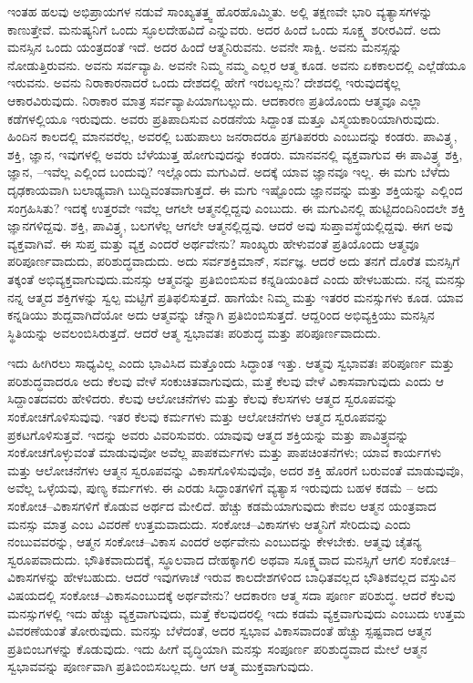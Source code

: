 ಇಂತಹ ಹಲವು ಅಭಿಪ್ರಾಯಗಳ ನಡುವೆ ಸಾಂಖ್ಯತತ್ತ್ವ ಹೊರಹೊಮ್ಮಿತು. ಅಲ್ಲಿ ತಕ್ಷಣವೇ ಭಾರಿ ವ್ಯತ್ಯಾಸಗಳನ್ನು ಕಾಣುತ್ತೇವೆ. ಮನುಷ್ಯನಿಗೆ ಒಂದು ಸ್ಫೂಲದೇಹವಿದೆ ಎನ್ನುವರು. ಅದರ ಹಿಂದೆ ಒಂದು ಸೂಕ್ಷ್ಮ ಶರೀರವಿದೆ. ಅದು ಮನಸ್ಸಿನ ಒಂದು ಯಂತ್ರದಂತೆ ಇದೆ. ಅದರ ಹಿಂದೆ ಆತ್ಮನಿರುವನು. ಅವನೇ ಸಾಕ್ಷಿ. ಅವನು ಮನಸ್ಸನ್ನು ನೋಡುತ್ತಿರುವನು. ಅವನು ಸರ್ವವ್ಯಾಪಿ. ಅವನೇ ನಿಮ್ಮ ನಮ್ಮ ಎಲ್ಲರ ಆತ್ಮ ಕೂಡ. ಅವನು ಏಕಕಾಲದಲ್ಲಿ ಎಲ್ಲೆಡೆಯೂ ಇರುವನು. ಅವನು ನಿರಾಕಾರನಾದರೆ ಒಂದು ದೇಶದಲ್ಲಿ ಹೇಗೆ ಇರಬಲ್ಲನು? ದೇಶದಲ್ಲಿ ಇರುವುದಕ್ಕೆಲ್ಲ ಆಕಾರವಿರುವುದು. ನಿರಾಕಾರ ಮಾತ್ರ ಸರ್ವವ್ಯಾಪಿಯಾಗಬಲ್ಲುದು. ಆದಕಾರಣ ಪ್ರತಿಯೊಂದು ಆತ್ಮವೂ ಎಲ್ಲಾ ಕಡೆಗಳಲ್ಲಿಯೂ ಇರುವುದು. ಅವರು ಪ್ರತಿಪಾದಿಸುವ ಎರಡನೆಯ ಸಿದ್ದಾಂತ ಮತ್ತೂ ವಿಸ್ಮಯಕಾರಿಯಾಗಿರುವುದು. ಹಿಂದಿನ ಕಾಲದಲ್ಲಿ ಮಾನವರೆಲ್ಲ, ಅವರಲ್ಲಿ ಬಹುಪಾಲು ಜನರಾದರೂ ಪ್ರಗತಿಪರರು ಎಂಬುದನ್ನು ಕಂಡರು. ಪಾವಿತ್ರ್ಯ, ಶಕ್ತಿ, ಜ್ಞಾನ, ಇವುಗಳಲ್ಲಿ ಅವರು ಬೆಳೆಯುತ್ತ ಹೋಗುವುದನ್ನು ಕಂಡರು. ಮಾನವನಲ್ಲಿ ವ್ಯಕ್ತವಾಗುವ ಈ ಪಾವಿತ್ರ್ಯ ಶಕ್ತಿ, ಜ್ಞಾನ, –ಇವೆಲ್ಲ ಎಲ್ಲಿಂದ ಬಂದುವು? ಇಲ್ಲೊಂದು ಮಗುವಿದೆ. ಅದಕ್ಕೆ ಯಾವ ಜ್ಞಾನವೂ ಇಲ್ಲ. ಈ ಮಗು ಬೆಳೆದು ದೃಢಕಾಯವಾಗಿ ಬಲಾಢ್ಯವಾಗಿ ಬುದ್ದಿವಂತವಾಗುತ್ತದೆ. ಈ ಮಗು ಇಷ್ಟೊಂದು ಜ್ಞಾನವನ್ನು ಮತ್ತು ಶಕ್ತಿಯನ್ನು ಎಲ್ಲಿಂದ ಸಂಗ್ರಹಿಸಿತು? ಇದಕ್ಕೆ ಉತ್ತರವೇ ಇವೆಲ್ಲ ಆಗಲೇ ಆತ್ಮನಲ್ಲಿದ್ದವು ಎಂಬುದು. ಈ ಮಗುವಿನಲ್ಲಿ ಹುಟ್ಟಿದಂದಿನಿಂದಲೇ ಶಕ್ತಿ ಜ್ಞಾನಗಳಿದ್ದವು. ಶಕ್ತಿ, ಪಾವಿತ್ರ್ಯ, ಬಲಗಳೆಲ್ಲ ಆಗಲೇ ಆತ್ಮನಲ್ಲಿದ್ದವು. ಆದರೆ ಅವು ಸುಪ್ತಾವಸ್ಥೆಯಲ್ಲಿದ್ದವು. ಈಗ ಅವು ವ್ಯಕ್ತವಾಗಿವೆ. ಈ ಸುಪ್ತ ಮತ್ತು ವ್ಯಕ್ತ ಎಂದರೆ ಅರ್ಥವೇನು? ಸಾಂಖ್ಯರು ಹೇಳುವಂತೆ ಪ್ರತಿಯೊಂದು ಆತ್ಮವೂ ಪರಿಪೂರ್ಣವಾದುದು, ಪರಿಶುದ್ಧವಾದುದು. ಅದು ಸರ್ವಶಕ್ತಿಮಾನ್, ಸರ್ವಜ್ಞ. ಆದರೆ ಅದು ತನಗೆ ದೊರೆತ ಮನಸ್ಸಿಗೆ ತಕ್ಕಂತೆ ಅಭಿವ್ಯಕ್ತವಾಗುವುದು.\break ಮನಸ್ಸು ಆತ್ಮವನ್ನು ಪ್ರತಿಬಿಂಬಿಸುವ ಕನ್ನಡಿಯಂತಿದೆ ಎಂದು ಹೇಳಬಹುದು. ನನ್ನ ಮನಸ್ಸು ನನ್ನ ಆತ್ಮದ ಶಕ್ತಿಗಳನ್ನು ಸ್ವಲ್ಪ ಮಟ್ಟಿಗೆ ಪ್ರತಿಫಲಿಸುತ್ತದೆ. ಹಾಗೆಯೇ ನಿಮ್ಮ ಮತ್ತು ಇತರರ ಮನಸ್ಸುಗಳು ಕೂಡ. ಯಾವ ಕನ್ನಡಿಯು ಶುದ್ದವಾಗಿದೆಯೋ ಅದು ಆತ್ಮವನ್ನು ಚೆನ್ನಾಗಿ ಪ್ರತಿಬಿಂಬಿಸುತ್ತದೆ. ಆದ್ದರಿಂದ ಅಭಿವ್ಯಕ್ತಿಯು ಮನಸ್ಸಿನ ಸ್ಥಿತಿಯನ್ನು ಅವಲಂಬಿಸಿರುತ್ತದೆ. ಆದರೆ ಆತ್ಮ ಸ್ವಭಾವತಃ ಪರಿಶುದ್ಧ ಮತ್ತು ಪರಿಪೂರ್ಣವಾದುದು.

ಇದು ಹೀಗಿರಲು ಸಾಧ್ಯವಿಲ್ಲ ಎಂದು ಭಾವಿಸಿದ ಮತ್ತೊಂದು ಸಿದ್ಧಾಂತ ಇತ್ತು. ಆತ್ಮವು ಸ್ವಭಾವತಃ ಪರಿಪೂರ್ಣ ಮತ್ತು ಪರಿಶುದ್ಧವಾದರೂ ಅದು ಕೆಲವು ವೇಳೆ ಸಂಕುಚಿತವಾಗುವುದು, ಮತ್ತೆ ಕೆಲವು ವೇಳೆ ವಿಕಾಸವಾಗುವುದು ಎಂದು ಆ ಸಿದ್ದಾಂತದವರು ಹೇಳಿದರು. ಕೆಲವು ಆಲೋಚನೆಗಳು ಮತ್ತು ಕೆಲವು ಕೆಲಸಗಳು ಆತ್ಮದ ಸ್ವರೂಪವನ್ನು ಸಂಕೋಚಗೊಳಿಸುವುವು. ಇತರ ಕೆಲವು ಕರ್ಮಗಳು ಮತ್ತು ಆಲೋಚನೆಗಳು ಆತ್ಮದ ಸ್ವರೂಪವನ್ನು ಪ್ರಕಟಗೊಳಿಸುತ್ತವೆ. ಇದನ್ನು ಅವರು ವಿವರಿಸುವರು. ಯಾವುವು ಆತ್ಮದ ಶಕ್ತಿಯನ್ನು ಮತ್ತು ಪಾವಿತ್ರ್ಯವನ್ನು ಸಂಕೋಚಗೊಳ್ಳುವಂತೆ ಮಾಡುವುವೋ ಅವೆಲ್ಲ ಪಾಪಕರ್ಮಗಳು ಮತ್ತು ಪಾಪಚಿಂತನೆಗಳು; ಯಾವ ಕಾರ್ಯಗಳು ಮತ್ತು ಆಲೋಚನೆಗಳು ಆತ್ಮನ ಸ್ವರೂಪವನ್ನು ವಿಕಾಸಗೊಳಿಸುವುವೊ, ಅದರ ಶಕ್ತಿ ಹೊರಗೆ ಬರುವಂತೆ ಮಾಡುವುವೊ, ಅವೆಲ್ಲ ಒಳ್ಳೆಯವು, ಪುಣ್ಯ ಕರ್ಮಗಳು. ಈ ಎರಡು ಸಿದ್ಧಾಂತಗಳಿಗೆ ವ್ಯತ್ಯಾಸ ಇರುವುದು ಬಹಳ ಕಡಮೆ – ಅದು ಸಂಕೋಚ–ವಿಕಾಸಗಳಿಗೆ ಕೊಡುವ ಅರ್ಥದ ಮೇಲಿದೆ. ಹೆಚ್ಚು ಕಡಮೆಯಾಗುವುದು ಕೇವಲ ಆತ್ಮನ ಯಂತ್ರವಾದ ಮನಸ್ಸು ಮಾತ್ರ ಎಂಬ ವಿವರಣೆ ಉತ್ತಮವಾದುದು. ಸಂಕೋಚ–ವಿಕಾಸಗಳು ಆತ್ಮನಿಗೆ ಸೇರಿದುವು ಎಂದು ನಂಬುವವರನ್ನು, ಆತ್ಮನ ಸಂಕೋಚ–ವಿಕಾಸ ಎಂದರೆ ಅರ್ಥವೇನು ಎಂಬುದನ್ನು ಕೇಳಬೇಕು. ಆತ್ಮವು ಚೈತನ್ಯ ಸ್ವರೂಪವಾದುದು. ಭೌತಿಕವಾದುದಕ್ಕೆ, ಸ್ಥೂಲವಾದ ದೇಹಕ್ಕಾಗಲಿ ಅಥವಾ ಸೂಕ್ಷ್ಮವಾದ ಮನಸ್ಸಿಗೆ ಆಗಲಿ ಸಂಕೋಚ–ವಿಕಾಸಗಳನ್ನು ಹೇಳಬಹುದು. ಆದರೆ ಇವುಗಳಾಚೆ ಇರುವ ಕಾಲದೇಶಗಳಿಂದ ಬಾಧಿತವಲ್ಲದ ಭೌತಿಕವಲ್ಲದ ವಸ್ತುವಿನ ವಿಷಯದಲ್ಲಿ ಸಂಕೋಚ–ವಿಕಾಸ\break ಎಂಬುದಕ್ಕೆ ಅರ್ಥವೇನು? ಆದಕಾರಣ ಆತ್ಮ ಸದಾ ಪೂರ್ಣ ಪರಿಶುದ್ಧ. ಆದರೆ ಕೆಲವು ಮನಸ್ಸುಗಳಲ್ಲಿ ಇದು ಹೆಚ್ಚು ವ್ಯಕ್ತವಾಗುವುದು, ಮತ್ತೆ ಕೆಲವುದರಲ್ಲಿ ಇದು ಕಡಮೆ ವ್ಯಕ್ತವಾಗುವುದು ಎಂಬುದು ಉತ್ತಮ ವಿವರಣೆಯಂತೆ ತೋರುವುದು. ಮನಸ್ಸು ಬೆಳೆದಂತೆ, ಅದರ ಸ್ವಭಾವ ವಿಕಾಸವಾದಂತೆ ಹೆಚ್ಚು ಸ್ಪಷ್ಟವಾದ ಆತ್ಮನ ಪ್ರತಿಬಿಂಬಗಳನ್ನು ಕೊಡುವುದು. ಇದು ಹೀಗೆ ವೃದ್ಧಿಯಾಗಿ ಮನಸ್ಸು ಸಂಪೂರ್ಣ ಪರಿಶುದ್ಧವಾದ ಮೇಲೆ ಆತ್ಮನ ಸ್ವಭಾವವನ್ನು ಪೂರ್ಣವಾಗಿ ಪ್ರತಿಬಿಂಬಿಸಬಲ್ಲದು. ಆಗ ಆತ್ಮ ಮುಕ್ತವಾಗುವುದು.


